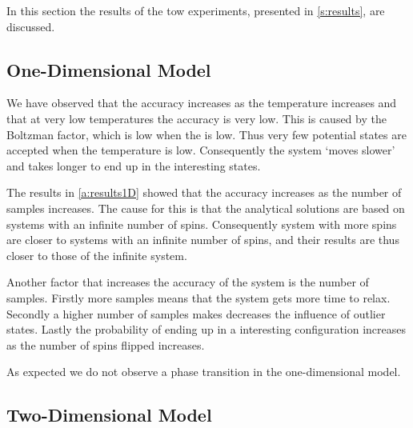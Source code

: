 In this section the results of the tow experiments, presented in \cref{s:results}, are discussed.

\subsection{One-Dimensional Model}
	
	We have observed that the accuracy increases as the temperature increases and that at very low temperatures the accuracy is very low. This is caused by the Boltzman factor, which is low when the \temperature is low. Thus very few potential states are accepted when the temperature is low. Consequently the system `moves slower' and takes longer to end up in the interesting states.
	
	The results in \cref{a:results1D} showed that the accuracy increases as the number of samples increases. The cause for this is that the analytical solutions are based on systems with an infinite number of spins. Consequently system with more spins are closer to systems with an infinite number of spins, and their results are thus closer to those of the infinite system. 

	Another factor that increases the accuracy of the system is the number of samples. Firstly more samples means that the system gets more time to relax. Secondly a higher number of samples makes decreases the influence of outlier states. Lastly the probability of ending up in a interesting configuration increases as the number of spins flipped increases.

	As expected we do not observe a phase transition in the one-dimensional model. 

\subsection{Two-Dimensional Model}


